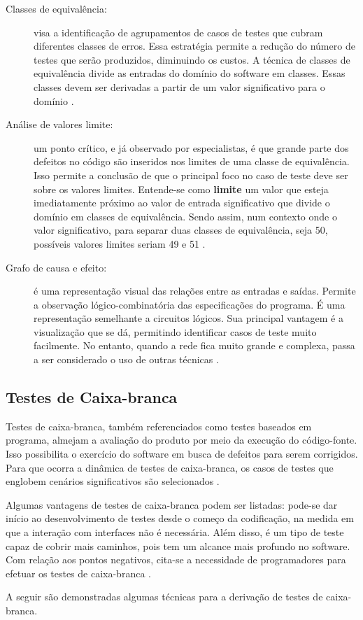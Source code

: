 \begin{description}
\item[Classes de equivalência:] visa a identificação de agrupamentos de casos
de testes que cubram diferentes classes de erros. Essa estratégia permite a
redução do número de testes que serão produzidos, diminuindo os custos. A
técnica de classes de equivalência divide as entradas do domínio do software em
classes. Essas classes devem ser derivadas a partir de um valor significativo
para o domínio \cite{williams2006}.
\item[Análise de valores limite:] um ponto crítico, e já observado por
especialistas, é que grande parte dos defeitos no código são inseridos nos
limites de uma classe de equivalência. Isso permite a conclusão de que o
principal foco no caso de teste deve ser sobre os valores limites. Entende-se
como \textbf{limite} um valor que esteja imediatamente próximo ao valor de
entrada significativo que divide o domínio em classes de equivalência. Sendo
assim, num contexto onde o valor significativo, para separar duas classes de
equivalência, seja 50, possíveis valores limites seriam 49 e 51
\cite{williams2006}.
\item[Grafo de causa e efeito:] é uma representação visual das relações entre
as entradas e saídas. Permite a observação lógico-combinatória das
especificações do programa. É uma representação semelhante a circuitos lógicos.
Sua principal vantagem é a visualização que se dá, permitindo identificar casos
de teste muito facilmente. No entanto, quando a rede fica muito grande e
complexa, passa a ser considerado o uso de outras técnicas
\cite{barbosaEtAl2009}.
\end{description}


\subsection{Testes de Caixa-branca}
Testes de caixa-branca, também referenciados como testes baseados em programa,
almejam a avaliação do produto por meio da execução do código-fonte. Isso
possibilita o exercício do software em busca de defeitos para serem corrigidos.
Para que ocorra a dinâmica de testes de caixa-branca, os casos de testes que
englobem cenários significativos são selecionados \cite{barbosaEtAl2009}.
\par
\indent Algumas vantagens de testes de caixa-branca podem ser listadas: pode-se
dar início ao desenvolvimento de testes desde o começo da codificação, na
medida em que a interação com interfaces não é necessária. Além disso, é um
tipo de teste capaz de cobrir mais caminhos, pois tem um alcance mais profundo
no software. Com relação aos pontos negativos, cita-se a necessidade de
programadores para efetuar os testes de caixa-branca \cite{barbosaEtAl2009}.
\par
\indent A seguir são demonstradas algumas técnicas para a derivação de testes
de caixa-branca.

